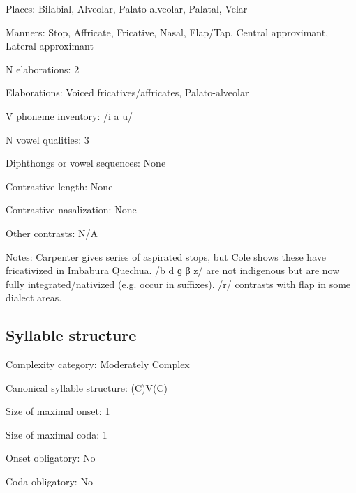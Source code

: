 {\begin{appendixdesc}
\item[Places:] Bilabial, Alveolar, Palato-alveolar, Palatal, Velar

\item[Manners:] Stop, Affricate, Fricative, Nasal, Flap/Tap, Central approximant, Lateral approximant

\item[N elaborations:] 2

\item[Elaborations:] Voiced fricatives/affricates, Palato-alveolar

\item[V phoneme inventory:] /i a u/

\item[N vowel qualities:] 3

\item[Diphthongs or vowel sequences:] None

\item[Contrastive length:] None

\item[Contrastive nasalization:] None

\item[Other contrasts:] N/A

\item[Notes:] Carpenter gives series of aspirated stops, but Cole shows these have fricativized in Imbabura Quechua. /b d ɡ β z/ are not indigenous but are now fully integrated/nativized (e.g. occur in suffixes). /r/ contrasts with flap in some dialect areas.
\end{appendixdesc}
\subsection*{Syllable structure}
\begin{appendixdesc}

\item[Complexity category:] Moderately Complex

\item[Canonical syllable structure:] (C)V(C) \citep[203--205]{Cole1982}

\item[Size of maximal onset:] 1

\item[Size of maximal coda:] 1

\item[Onset obligatory:] No

\item[Coda obligatory:] No


\end{appendixdesc}}
